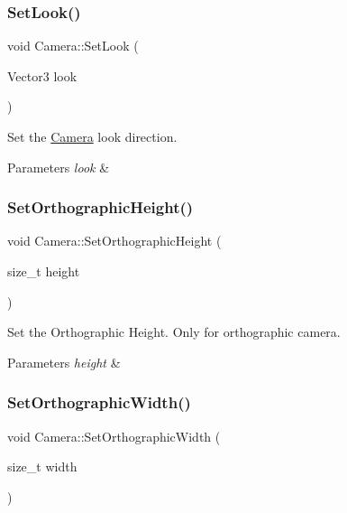 \subsubsection{\texorpdfstring{Set\+Look()}{SetLook()}}
{\footnotesize\ttfamily void Camera\+::\+Set\+Look (\begin{DoxyParamCaption}\item[{Vector3}]{look }\end{DoxyParamCaption})}



Set the \hyperlink{classCamera}{Camera} look direction. 


\begin{DoxyParams}{Parameters}
{\em look} & \\
\hline
\end{DoxyParams}
\mbox{\label{classCamera_a59239b01b73f2e6aeb482b32831aba2b}} 
\subsubsection{\texorpdfstring{Set\+Orthographic\+Height()}{SetOrthographicHeight()}}
{\footnotesize\ttfamily void Camera\+::\+Set\+Orthographic\+Height (\begin{DoxyParamCaption}\item[{size\+\_\+t}]{height }\end{DoxyParamCaption})}



Set the Orthographic Height. Only for orthographic camera. 


\begin{DoxyParams}{Parameters}
{\em height} & \\
\hline
\end{DoxyParams}
\mbox{\label{classCamera_aa4d72b13e178899c2bdb68652a8fd10a}} 
\subsubsection{\texorpdfstring{Set\+Orthographic\+Width()}{SetOrthographicWidth()}}
{\footnotesize\ttfamily void Camera\+::\+Set\+Orthographic\+Width (\begin{DoxyParamCaption}\item[{size\+\_\+t}]{width }\end{DoxyParamCaption})}



